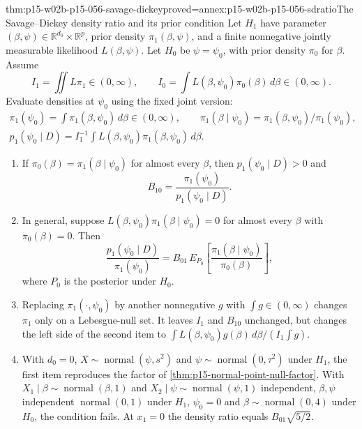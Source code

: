 \begin{hbtheorem}{thm:p15-w02b-p15-056-savage-dickey}{proved=annex:p15-w02b-p15-056-sdratio}{The Savage--Dickey density ratio and its prior condition}
Let \(H_1\) have parameter \((\beta,\psi)\in\mathbb R^{d_0}\times\mathbb R^p\),
prior density \(\pi_1(\beta,\psi)\), and a finite nonnegative jointly
measurable likelihood \(L(\beta,\psi)\). Let \(H_0\) be \(\psi=\psi_0\),
with prior density \(\pi_0\) for \(\beta\). Assume
\[
 I_1=\iint L\pi_1\in(0,\infty),\qquad
 I_0=\int L(\beta,\psi_0)\pi_0(\beta)\,d\beta\in(0,\infty).
\]
Evaluate densities at \(\psi_0\) using the fixed joint version:
\[
\begin{gathered}
 \pi_1(\psi_0)=\int\pi_1(\beta,\psi_0)\,d\beta\in(0,\infty),\qquad
 \pi_1(\beta\mid\psi_0)=\pi_1(\beta,\psi_0)/\pi_1(\psi_0),\\
 p_1(\psi_0\mid D)=I_1^{-1}\int L(\beta,\psi_0)\pi_1(\beta,\psi_0)\,d\beta .
\end{gathered}
\]
\begin{enumerate}
\item If \(\pi_0(\beta)=\pi_1(\beta\mid\psi_0)\) for almost every
\(\beta\), then \(p_1(\psi_0\mid D)>0\) and
\[
 B_{10}=\frac{\pi_1(\psi_0)}{p_1(\psi_0\mid D)} .
\]
\item In general, suppose \(L(\beta,\psi_0)\pi_1(\beta\mid\psi_0)=0\) for
almost every \(\beta\) with \(\pi_0(\beta)=0\). Then
\[
 \frac{p_1(\psi_0\mid D)}{\pi_1(\psi_0)}
 =B_{01}\,E_{P_0}\!\left[\frac{\pi_1(\beta\mid\psi_0)}{\pi_0(\beta)}\right],
\]
where \(P_0\) is the posterior under \(H_0\).
\item Replacing \(\pi_1(\cdot,\psi_0)\) by another nonnegative \(g\)
with \(\int g\in(0,\infty)\) changes \(\pi_1\) only on a Lebesgue-null
set. It leaves \(I_1\) and \(B_{10}\) unchanged, but changes the left
side of the second item to \(\int L(\beta,\psi_0)g(\beta)\,d\beta/(I_1\int g)\).
\item With \(d_0=0\), \(X\sim\operatorname{normal}(\psi,s^2)\) and
\(\psi\sim\operatorname{normal}(0,\tau^2)\) under \(H_1\), the first
item reproduces the factor of \cref{thm:p15-normal-point-null-factor}.
With \(X_1\mid\beta\sim\operatorname{normal}(\beta,1)\) and
\(X_2\mid\psi\sim\operatorname{normal}(\psi,1)\) independent, \(\beta,\psi\)
independent \(\operatorname{normal}(0,1)\) under \(H_1\),
\(\psi_0=0\) and \(\beta\sim\operatorname{normal}(0,4)\) under \(H_0\),
the condition fails. At \(x_1=0\) the density ratio equals
\(B_{01}\sqrt{5/2}\).
\end{enumerate}
\end{hbtheorem}

